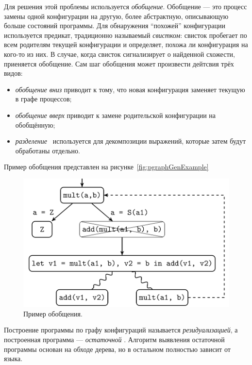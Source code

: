 Для решения этой проблемы используется \emph{обобщение}\cite{scGen}. Обобщение --- это процесс
замены одной конфигурации на другую, более абстрактную, описывающую больше состояний
программы. Для обнаружения ``похожей'' конфигурации используется предикат,
традиционно называемый \emph{свистком}: свисток пробегает по всем
родителям текущей конфигурации и определяет, похожа ли конфигурация на кого-то из них.
В случае, когда свисток сигнализирует о найденной схожести, приеняется обобщение.
Сам шаг обобщения может произвести дейтсвия трёх видов:
\begin{itemize}
\item \emph{обобщение вниз} приводит к тому, что новая конфигурация заменяет текущую в графе процессов;
\item \emph{обобщение вверх} приводит к замене родительской конфигурации на обобщённую;
\item \emph{разделение}~ используется для декомпозиции выражений, которые затем
будут обработаны отдельно.
\end{itemize}
Пример обобщения представлен на рисунке~\ref{fig:pgraphGenExample}

\begin{figure}[h!]
\includegraphics[scale=0.3]{./review/scgenex_temp.png}
\caption{Пример обобщения.}
\label{fig:pgraphFoldingExample}
\end{figure}

Построение программы по графу конфигураций называется \emph{резидуализацией}, а
построенная программа --- \emph{остаточной} .
Алгоритм выявления остаточной программы основан на обходе дерева, но
в остальном полностью зависит от языка.

